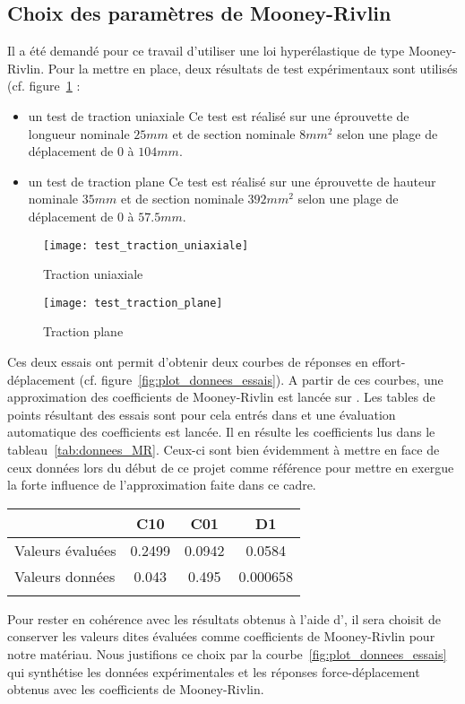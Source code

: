 ﻿ \documentclass{article}
\newcommand{\abaqus}{\bsc{Abaqus}\xspace}
\begin{document}
\subsection{Choix des paramètres de Mooney-Rivlin}

Il a été demandé pour ce travail d'utiliser une loi hyperélastique de type Mooney-Rivlin. Pour la mettre en place, deux résultats de test expérimentaux sont utilisés (cf. figure~\ref{fig:essais_exp} : 
\begin{itemize}
\item un test de traction uniaxiale
Ce test est réalisé sur une éprouvette de longueur nominale $25 mm$ et de section nominale $8 mm^2$ selon une plage de déplacement de $0$ à $104 mm$.
\item un test de traction plane
Ce test est réalisé sur une éprouvette de hauteur nominale $35 mm$ et de section nominale $392 mm^2$ selon une plage de déplacement de $0$ à $57.5 mm$.
\end{itemize}

\begin{figure}
\texttt{[image: test\_traction\_uniaxiale]}
\caption{Traction uniaxiale}
\texttt{[image: test\_traction\_plane]}
\caption{Traction plane}
\label{fig:essais_exp}
\end{figure}

Ces deux essais ont permit d'obtenir deux courbes de réponses en effort-déplacement (cf. figure~\ref{fig:plot_donnees_essais}). A partir de ces courbes, une approximation des coefficients de Mooney-Rivlin est lancée sur \abaqus. Les tables de points résultant des essais sont pour cela entrés dans \abaqus et une évaluation automatique des coefficients est lancée. Il en résulte les coefficients lus dans le tableau~\ref{tab:donnees_MR}. Ceux-ci sont bien évidemment à mettre en face de ceux données lors du début de ce projet comme référence pour mettre en exergue la forte influence de l'approximation faite dans ce cadre.

\begin{tabular}{|l|c|c|c|}
\hline
 & C10 & C01 & D1 \\ \hline
Valeurs évaluées & 0.2499 & 0.0942 & 0.0584 \\ \hline
Valeurs données & 0.043  & 0.495 & 0.000658 \\ \hline
\label{tab:donnees_MR}
\end{tabular} 

Pour rester en cohérence avec les résultats obtenus à l'aide d'\abaqus, il sera choisit de conserver les valeurs dites évaluées comme coefficients de Mooney-Rivlin pour notre matériau. Nous justifions ce choix par la courbe~\ref{fig:plot_donnees_essais} qui synthétise les données expérimentales et les réponses force-déplacement obtenus avec les coefficients de Mooney-Rivlin.
\end{document}
